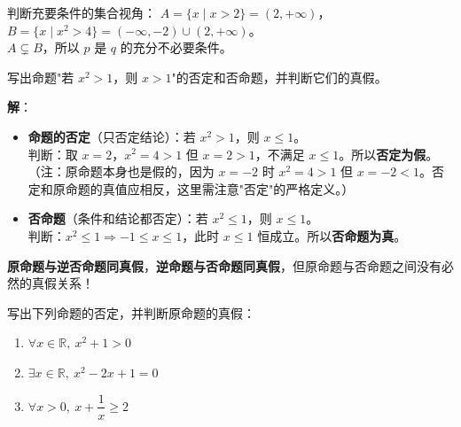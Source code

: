\documentclass[12pt, a4paper]{ctexart}
\begin{document}
\begin{tipbox}[方法总结]
判断充要条件的集合视角：
$A = \{x \mid x > 2\} = (2, +\infty)$，$B = \{x \mid x^2 > 4\} = (-\infty, -2) \cup (2, +\infty)$。\\
$A \subsetneq B$，所以 $p$ 是 $q$ 的充分不必要条件。
\end{tipbox}

\begin{examplebox}[【例7】命题的否定与否命题]
写出命题"若 $x^2 > 1$，则 $x > 1$"的否定和否命题，并判断它们的真假。
\end{examplebox}

\textbf{解}：
\begin{itemize}[leftmargin=2em]
  \item \textbf{命题的否定}（只否定结论）：若 $x^2 > 1$，则 $x \leq 1$。\\
    判断：取 $x = 2$，$x^2 = 4 > 1$ 但 $x = 2 > 1$，不满足 $x \leq 1$。所以\textbf{否定为假}。\\
    （注：原命题本身也是假的，因为 $x = -2$ 时 $x^2 = 4 > 1$ 但 $x = -2 < 1$。否定和原命题的真值应相反，这里需注意"否定"的严格定义。）
  \item \textbf{否命题}（条件和结论都否定）：若 $x^2 \leq 1$，则 $x \leq 1$。\\
    判断：$x^2 \leq 1 \Rightarrow -1 \leq x \leq 1$，此时 $x \leq 1$ 恒成立。所以\textbf{否命题为真}。
\end{itemize}

\begin{warnbox}[提醒]
\textbf{原命题与逆否命题同真假}，\textbf{逆命题与否命题同真假}，但原命题与否命题之间没有必然的真假关系！
\end{warnbox}

\begin{examplebox}[【例8】全称命题与特称命题的否定]
写出下列命题的否定，并判断原命题的真假：
\begin{enumerate}[label=(\arabic*)]
  \item $\forall x \in \mathbb{R},\ x^2 + 1 > 0$
  \item $\exists x \in \mathbb{R},\ x^2 - 2x + 1 = 0$
  \item $\forall x > 0,\ x + \dfrac{1}{x} \geq 2$
\end{enumerate}
\end{examplebox}
\end{document}
